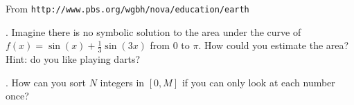 \begin{marginfigure}[-1.8in]
\begin{center}
\end{center}
\caption{\tiny From  {\tt http://www.pbs.org/wgbh/nova/education/earth}}
\end{marginfigure}

\vspace{15mm}

.  Imagine there is no symbolic solution to the area under the curve of $f(x) = \sin(x) + \frac{1}{3} \sin(3x)$ from $0$ to $\pi$. How could you estimate the area? Hint: do you like playing darts?

\begin{marginfigure}
\begin{center}
\end{center}
\end{marginfigure}

\vspace{20mm}

.  How can you sort $N$ integers in $[0,M]$ if you can only look at each number once?

